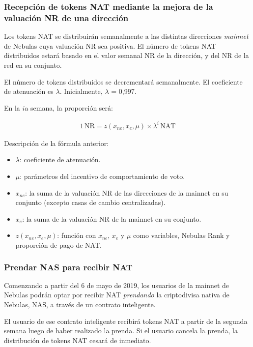 \subsubsection{Recepción de tokens NAT mediante la mejora de la valuación NR de una dirección}

Los tokens NAT se distribuirán semanalmente a las distintas direcciones \textit{mainnet} de Nebulas cuya valuación NR sea positiva. El número de tokens NAT distribuidos estará basado en el valor semanal NR de la dirección, y del NR de la red en su conjunto.

El número de tokens distribuidos se decrementará semanalmente. El coeficiente de atenuación es $\lambda$. Inicialmente, $\lambda$ = 0,997.

En la $i$a semana, la proporción será:

\begin{align}
1\,\text{NR}=z(x_{ne},x_{e},\mu)\times\lambda^{i}\,\text{NAT}
\end{align}

Descripción de la fórmula anterior:

\begin{itemize}
	\item $\lambda$: coeficiente de atenuación.
	\item $\mu$: parámetros del incentivo de comportamiento de voto.
	\item $x_{ne}$: la suma de la valuación NR de las direcciones de la mainnet en su conjunto (excepto casas de cambio centralizadas).
	\item $x_{e}$: la suma de la valuación NR de la mainnet en su conjunto.
	\item $z(x_{ne},x_{e},\mu)$: función con $x_{ne}$, $x_{e}$ y $\mu$ como variables, Nebulas Rank y proporción de pago de NAT.
\end{itemize}

\subsubsection{Prendar NAS para recibir NAT}

Comenzando a partir del 6 de mayo de 2019, los usuarios de la mainnet de Nebulas podrán optar por recibir NAT \emph{prendando} la criptodivisa nativa de Nebulas, NAS, a través de un contrato inteligente.

El usuario de ese contrato inteligente recibirá tokens NAT a partir de la segunda semana luego de haber realizado la prenda. Si el usuario cancela la prenda, la distribución de tokens NAT cesará de inmediato.

